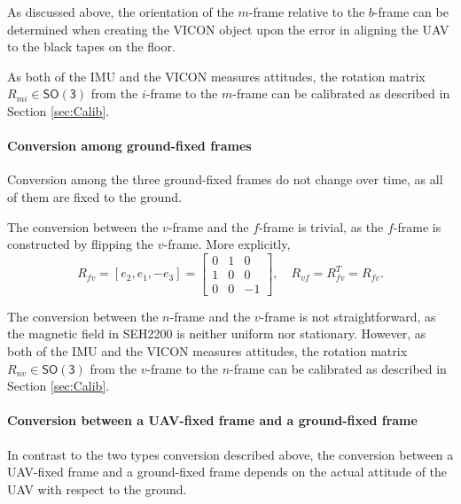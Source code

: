 \documentclass[11pt]{article}
\newcommand{\SO}{\ensuremath{\mathsf{SO(3)}}}
\begin{document}
As discussed above, the orientation of the $m$-frame relative to the $b$-frame can be determined when creating the VICON object upon the error in aligning the UAV to the black tapes on the floor. 

As both of the IMU and the VICON measures attitudes, the rotation matrix $R_{mi}\in\SO$ from the $i$-frame to the $m$-frame can be calibrated as described in Section \ref{sec:Calib}.


\paragraph{Conversion among ground-fixed frames} Conversion among the three ground-fixed frames do not change over time, as all of them are fixed to the ground.

The conversion between the $v$-frame and the $f$-frame is trivial, as the $f$-frame is constructed by flipping the $v$-frame. More explicitly, 
\begin{equation}
R_{fv} = [e_2, e_1, -e_3] = 
\begin{bmatrix}
0 & 1 & 0\\
1 & 0 & 0 \\
0 & 0 & -1
\end{bmatrix},\quad
R_{vf} = R_{fv}^T = R_{fv}.
\end{equation}

The conversion between the $n$-frame and the $v$-frame is not straightforward, as the magnetic field in SEH2200 is neither uniform nor stationary. However, as both of the IMU and the VICON measures attitudes, the rotation matrix $R_{nv}\in\SO$ from the $v$-frame to the $n$-frame can be calibrated as described in Section \ref{sec:Calib}.


\paragraph{Conversion between a UAV-fixed frame and a ground-fixed frame} In contrast to the two types conversion described above, the conversion between a UAV-fixed frame and a ground-fixed frame depends on the actual attitude of the UAV with respect to the ground. 
\end{document}
